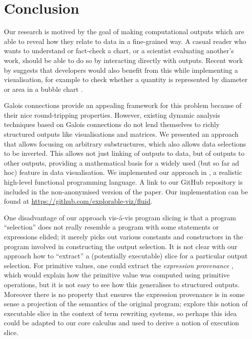 \section{Conclusion}
\label{sec:conclusion}

Our research is motived by the goal of making computational outputs which are able to reveal how they relate to data in a fine-grained way. A casual reader who wants to understand or fact-check a chart, or a scientist evaluating another's work, should be able to do so by interacting directly with outputs. Recent work by \citeauthor{walny19} suggests that developers would also benefit from this while implementing a visualisation, for example to check whether a quantity is represented by diameter or area in a bubble chart \cite{walny19}.

Galois connections provide an appealing framework for this problem because of their nice round-tripping properties. However,  existing dynamic analysis techniques based on Galois connections do not lend themselves to richly structured outputs like visualisations and matrices. We presented an approach that allows focusing on arbitrary substructures, which also allows data selections to be inverted. This allows not just linking of outputs to data, but of outputs to other outputs, providing a mathematical basis for a widely used (but so far ad hoc) feature in data visualisation. We implemented our approach in \OurLanguage, a realistic high-level functional programming language. %
\ifanonymous%
   A link to our GitHub repository is included in the non-anonymised version of the paper.
\else%
   Our implementation can be found at \url{https://github.com/explorable-viz/fluid}.%
\fi%

One disadvantage of our approach vis-\'a-vis program slicing is that a program ``selection'' does not really resemble a program with some statements or expressions elided; it merely picks out various constants and constructors in the program involved in constructing the output selection. It is not clear with our approach how to ``extract'' a (potentially executable) slice for a particular output selection. For primitive values, one could extract the \emph{expression provenance} \cite{acar12}, which would explain how the primitive value was computed using primitive operations, but it is not easy to see how this generalises to structured outputs. Moreover there is no property that ensures the expression provenance is in some sense a projection of the semantics of the original program; \citet{field98} explore this notion of executable slice in the context of term rewriting systems, so perhaps this idea could be adapted to our core calculus and used to derive a notion of execution slice.

